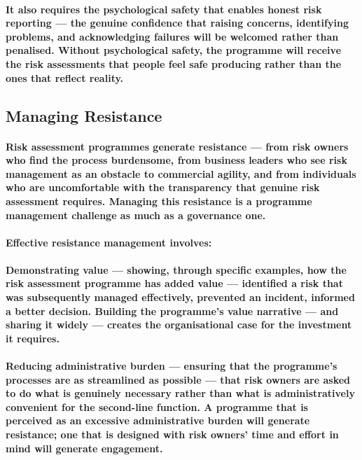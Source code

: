 \paragraph{It also requires the psychological safety that enables honest risk reporting — the genuine confidence that raising concerns, identifying problems, and acknowledging failures will be welcomed rather than penalised. Without psychological safety, the programme will receive the risk assessments that people feel safe producing rather than the ones that reflect reality.}

\subsection{Managing Resistance}
\paragraph{Risk assessment programmes generate resistance — from risk owners who find the process burdensome, from business leaders who see risk management as an obstacle to commercial agility, and from individuals who are uncomfortable with the transparency that genuine risk assessment requires. Managing this resistance is a programme management challenge as much as a governance one.}
\paragraph{Effective resistance management involves:}
\paragraph{\textbf{Demonstrating value} — showing, through specific examples, how the risk assessment programme has added value — identified a risk that was subsequently managed effectively, prevented an incident, informed a better decision. Building the programme's value narrative — and sharing it widely — creates the organisational case for the investment it requires.}
\paragraph{\textbf{Reducing administrative burden} — ensuring that the programme's processes are as streamlined as possible — that risk owners are asked to do what is genuinely necessary rather than what is administratively convenient for the second-line function. A programme that is perceived as an excessive administrative burden will generate resistance; one that is designed with risk owners' time and effort in mind will generate engagement.}
